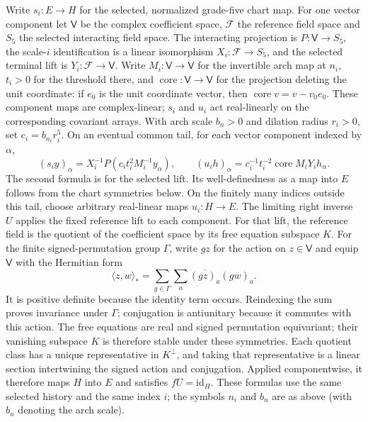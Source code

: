 Write $s_i:E\to H$ for the selected, normalized grade-five chart map. For
one vector component let $\mathsf V$ be the complex coefficient space,
$\mathcal F$ the reference field space and $S_5$ the selected
interacting field space. The interacting projection is $P:\mathsf V\to
S_5$, the scale-$i$ identification is a linear isomorphism
$X_i:\mathcal F\to S_5$, and the selected terminal lift is
$Y_i:\mathcal F\to\mathsf V$. Write $M_i:\mathsf V\to\mathsf V$
for the invertible arch map at $n_i$, $t_i>0$ for the threshold there, and
$\operatorname{core}:\mathsf V\to\mathsf V$ for the projection deleting
the unit coordinate: if $e_0$ is the unit coordinate vector, then
$\operatorname{core}v=v-v_0e_0$. These component maps are complex-linear; $s_i$ and $u_i$ act real-linearly on the
corresponding covariant arrays. With arch scale $b_n>0$ and dilation radius $r_i>0$, set
$c_i=b_{n_i}r_i^5$. On an eventual common tail, for each vector component
indexed by $\alpha$,
\begin{equation}
 (s_i y)_\alpha=X_i^{-1}P(c_i t_i^2 M_i^{-1}y_\alpha),\qquad
 (u_i h)_\alpha=c_i^{-1}t_i^{-2}\operatorname{core} M_iY_i h_\alpha.
 \label{eq:trace-sensor-selected-formulas}
\end{equation}
The second formula is for the selected lift. Its well-definedness as a map
into $E$ follows from the chart symmetries below. On the finitely many indices
outside this tail, choose arbitrary real-linear maps $u_i:H\to E$. The limiting right inverse
$U$ applies the fixed reference lift to each component. For that
lift, the reference field is the quotient of the coefficient space by its
free equation subspace $K$. For the finite signed-permutation group $\Gamma$,
write $g z$ for the action on $z\in\mathsf V$ and equip $\mathsf V$
with the Hermitian form
\[
 \langle z,w\rangle_*=\sum_{g\in\Gamma}\sum_a
             \overline{(gz)_a}(gw)_a.
\]
It is positive definite because the identity term occurs. Reindexing the
sum proves invariance under $\Gamma$; conjugation is antiunitary because
it commutes with this action. The free equations are real and signed
permutation equivariant; their vanishing subspace $K$ is therefore stable
under these symmetries. Each quotient class has a
unique representative in $K^\perp$, and taking that representative is a
linear section intertwining the signed action and conjugation. Applied
componentwise, it therefore maps $H$ into $E$ and satisfies $fU=\mathrm{id}_H$.
These formulas use the same selected history and the same index $i$; the
symbols $n_i$ and $b_n$ are as above (with $b_n$ denoting the arch scale).
